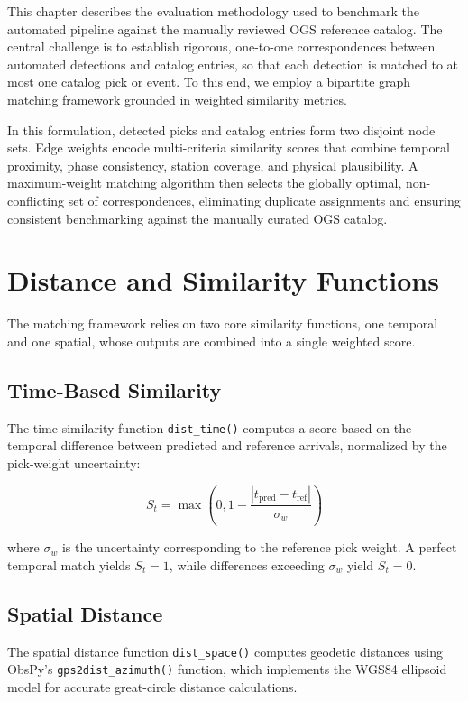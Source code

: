\label{chap:Methodology}
This chapter describes the evaluation methodology used to benchmark the
automated pipeline against the manually reviewed OGS reference catalog. The
central challenge is to establish rigorous, one-to-one correspondences between
automated detections and catalog entries, so that each detection is matched to
at most one catalog pick or event. To this end, we employ a bipartite graph
matching framework grounded in weighted similarity metrics.

In this formulation, detected picks and catalog entries form two disjoint node
sets. Edge weights encode multi-criteria similarity scores that combine
temporal proximity, phase consistency, station coverage, and physical
plausibility. A maximum-weight matching algorithm then selects the globally
optimal, non-conflicting set of correspondences, eliminating duplicate
assignments and ensuring consistent benchmarking against the manually curated
OGS catalog.

\section{Distance and Similarity Functions}

The matching framework relies on two core similarity functions, one temporal
and one spatial, whose outputs are combined into a single weighted score.

\subsection{Time-Based Similarity}
The time similarity function \texttt{dist\_time()} computes a score based on
the temporal difference between predicted and reference arrivals, normalized by
the pick-weight uncertainty:

\begin{equation}
  S_t = \max\left(0, 1 - \frac{|t_{\text{pred}} -
  t_{\text{ref}}|}{\sigma_w}\right)
\end{equation}

where $\sigma_w$ is the uncertainty corresponding to the reference pick weight.
A perfect temporal match yields $S_t = 1$, while differences exceeding
$\sigma_w$ yield $S_t = 0$.

\subsection{Spatial Distance}
The spatial distance function \texttt{dist\_space()} computes geodetic
distances using ObsPy's \texttt{gps2dist\_azimuth()} function, which implements
the WGS84 ellipsoid model for accurate great-circle distance calculations.

